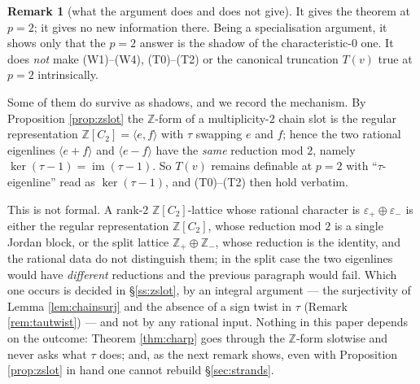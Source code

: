 \documentclass[reqno]{amsart}
\theoremstyle{plain}
\theoremstyle{definition}
\newtheorem{remark}[theorem]{Remark}
\DeclareMathOperator{\im}{im}
\newcommand{\eps}{\varepsilon}
\begin{document}
\begin{remark}[what the argument does and does not give]
It gives the theorem at $p=2$; it gives no new information there.  Being a
specialisation argument, it shows only that the $p=2$ answer is the shadow of
the characteristic-$0$ one.  It does \emph{not} make (W1)--(W4), (T0)--(T2) or
the canonical truncation $T(v)$ true at $p=2$ intrinsically.

Some of them do survive as shadows, and we record the mechanism.  By
Proposition \ref{prop:zslot} the $\mathbb{Z}$-form of a multiplicity-$2$ chain
slot is the regular representation $\mathbb{Z}[C_2]=\langle e,f\rangle$ with
$\tau$ swapping $e$ and $f$; hence the two rational eigenlines
$\langle e+f\rangle$ and $\langle e-f\rangle$ have the \emph{same} reduction
mod $2$, namely $\ker(\tau-1)=\im(\tau-1)$.  So $T(v)$ remains definable at
$p=2$ with ``$\tau$-eigenline'' read as $\ker(\tau-1)$, and (T0)--(T2) then
hold verbatim.

This is not formal.  A rank-$2$ $\mathbb{Z}[C_2]$-lattice whose rational
character is $\eps_+\oplus\eps_-$ is either the regular representation
$\mathbb{Z}[C_2]$, whose reduction mod $2$ is a single Jordan block, or the
split lattice $\mathbb{Z}_+\oplus\mathbb{Z}_-$, whose reduction is the
identity, and the rational data do not distinguish them; in the split case the
two eigenlines would have \emph{different} reductions and the previous
paragraph would fail.  Which one occurs is decided in \S\ref{ss:zslot}, by an
integral argument --- the surjectivity of Lemma \ref{lem:chainsurj} and the
absence of a sign twist in $\tau$ (Remark \ref{rem:tautwist}) --- and not by
any rational input.  Nothing in this paper depends on the outcome: Theorem
\ref{thm:charp} goes through the $\mathbb{Z}$-form slotwise and never asks
what $\tau$ does; and, as the next remark shows, even with Proposition
\ref{prop:zslot} in hand one cannot rebuild \S\ref{sec:strands}.
\end{remark}
\end{document}
